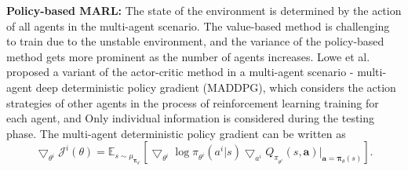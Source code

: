 \documentclass[acmsmall]{acmart}
\begin{document}
\textbf{Policy-based MARL: }The state of the environment is determined by the action of all agents in the multi-agent scenario. The value-based method is challenging to train due to the unstable environment, and the variance of the policy-based method gets more prominent as the number of agents increases. 
Lowe et al. \cite{maddpg} proposed a variant of the actor-critic method in a multi-agent scenario - multi-agent deep deterministic policy gradient (MADDPG), which considers the action strategies of other agents in the process of reinforcement learning training for each agent, and Only individual information is considered during the testing phase. The multi-agent deterministic policy gradient can be written as 
\begin{equation}\label{maddpg}
    \bigtriangledown_{\theta^i} \mathcal J^i\left(\theta\right) = \mathbb E_{s\sim \mu_{\bm \pi_{\theta^i}}} \left[\bigtriangledown_{\theta^i} \mathop{log}\pi_{\theta^i} \left(a^i|s\right) \bigtriangledown_{a^i} Q_{\pi_{\theta^i}}\left(s,\bm a\right)|_{\bm a=\bm \pi_\theta \left(s\right)}\right].
\end{equation}
\end{document}
